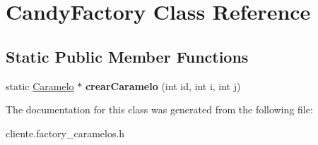 \hypertarget{classCandyFactory}{\section{Candy\-Factory Class Reference}
\label{classCandyFactory}
}
\subsection*{Static Public Member Functions}
\begin{DoxyCompactItemize}
\item 
\hypertarget{classCandyFactory_a2dcc29f3fdadc5694c22bcd500f7c4dd}{static \hyperlink{classCaramelo}{Caramelo} $\ast$ {\bfseries crear\-Caramelo} (int id, int i, int j)}\label{classCandyFactory_a2dcc29f3fdadc5694c22bcd500f7c4dd}

\end{DoxyCompactItemize}


The documentation for this class was generated from the following file\-:\begin{DoxyCompactItemize}
\item 
cliente.\-factory\-\_\-caramelos.\-h\end{DoxyCompactItemize}
